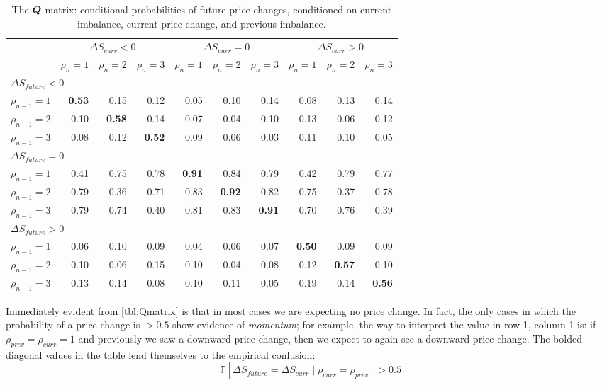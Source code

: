 \begin{table}[H]
\centering
{}
\begin{tabular}{@{} *{10}{r} @{}}
\toprule
& \multicolumn{3}{c}{$\Delta S_{curr} < 0$} & \multicolumn{3}{c}{$\Delta S_{curr} = 0$} & \multicolumn{3}{c}{$\Delta S_{curr} > 0$} \\
\cmidrule(lr){2-4} \cmidrule(lr){5-7} \cmidrule(lr){8-10}
&  $\rho_{n} = 1$ & $\rho_{n} = 2$ & $\rho_{n} = 3$ & $\rho_{n} = 1$ & $\rho_{n} = 2$ & $\rho_{n} = 3$ & $\rho_{n} = 1$ & $\rho_{n} = 2$ & $\rho_{n} = 3$ \\
\midrule
\multicolumn{10}{l}{$\Delta S_{future} < 0$} \\
$\rho_{n-1} = 1$ & \bf 0.53 & 0.15 & 0.12 & 0.05 & 0.10 & 0.14 & 0.08 & 0.13 & 0.14 \\
$\rho_{n-1} = 2$ & 0.10 & \bf 0.58 & 0.14 & 0.07 & 0.04 & 0.10 & 0.13 & 0.06 & 0.12 \\
$\rho_{n-1} = 3$ & 0.08 & 0.12 & \bf 0.52 & 0.09 & 0.06 & 0.03 & 0.11 & 0.10 & 0.05 \\[0.6ex]
\multicolumn{10}{l}{$\Delta S_{future} = 0$} \\
$\rho_{n-1} = 1$ & 0.41 & 0.75 & 0.78 & \bf 0.91 & 0.84 & 0.79 & 0.42 & 0.79 & 0.77 \\
$\rho_{n-1} = 2$ & 0.79 & 0.36 & 0.71 & 0.83 & \bf 0.92 & 0.82 & 0.75 & 0.37 & 0.78 \\
$\rho_{n-1} = 3$ & 0.79 & 0.74 & 0.40 & 0.81 & 0.83 & \bf 0.91 & 0.70 & 0.76 & 0.39 \\[0.6ex]
\multicolumn{10}{l}{$\Delta S_{future} > 0$} \\
$\rho_{n-1} = 1$ & 0.06 & 0.10 & 0.09 & 0.04 & 0.06 & 0.07 & \bf 0.50 & 0.09 & 0.09 \\
$\rho_{n-1} = 2$ & 0.10 & 0.06 & 0.15 & 0.10 & 0.04 & 0.08 & 0.12 & \bf 0.57 & 0.10 \\
$\rho_{n-1} = 3$ & 0.13 & 0.14 & 0.08 & 0.10 & 0.11 & 0.05 & 0.19 & 0.14 & \bf 0.56 \\
\bottomrule
\end{tabular}
\caption{The $\boldsymbol{Q}$ matrix: conditional probabilities of future price changes, conditioned on current imbalance, current price change, and previous imbalance.}
\label{tbl:Qmatrix}
\end{table}

Immediately evident from \autoref{tbl:Qmatrix} is that in most cases we are expecting no price change. In fact, the only cases in which the probability of a price change is $>0.5$ show evidence of \textit{momentum}; for example, the way to interpret the value in row 1, column 1 is: if $\rho_{prev} = \rho_{curr} = 1$ and previously we saw a downward price change, then we expect to again see a downward price change. The bolded diagonal values in the table lend themselves to the empirical conlusion:
\begin{equation}\label{eq:EDAKeyInsight}
\mathbb{P} \left[ \Delta S_{future} = \Delta S_{curr} \; | \; \rho_{curr} = \rho_{prev} \right] > 0.5
\end{equation}

